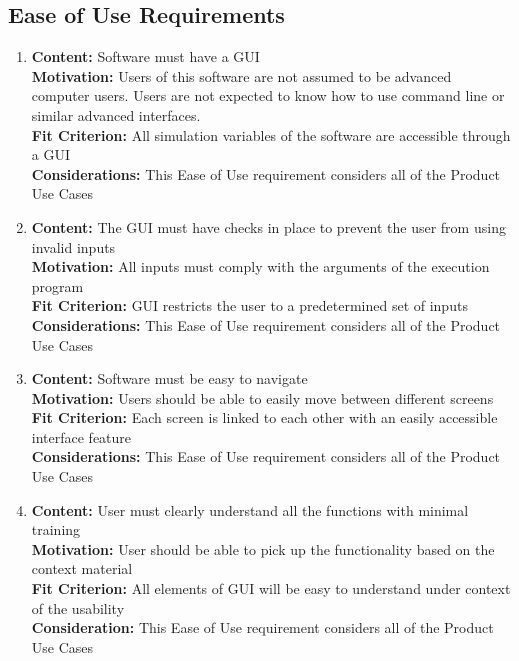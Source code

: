 \documentclass[paper=letter, fontsize=10pt]{scrartcl}
\numberwithin{equation}{section}		%
\numberwithin{figure}{section}			%
\numberwithin{table}{section}				%
\begin{document}
\subsection{Ease of Use Requirements}
\begin{enumerate}
	\item \textbf{Content:} Software must have a GUI
	\\	  \textbf{Motivation:} Users of this software are not assumed to be advanced computer users. Users are not expected to know how to use command line or similar advanced interfaces. 
	\\	  \textbf{Fit Criterion:} All simulation variables of the software are accessible through a GUI
	\\	  \textbf{Considerations:} This Ease of Use requirement considers all of the Product Use Cases
	\item \textbf{Content:} The GUI must have checks in place to prevent the user from using invalid inputs 
	\\	  \textbf{Motivation:} All inputs must comply with the arguments of the execution program
	\\	  \textbf{Fit Criterion:} GUI restricts the user to a predetermined set of inputs
	\\	  \textbf{Considerations:} This Ease of Use requirement considers all of the Product Use Cases
	\item \textbf{Content:} Software must be easy to navigate
	\\	  \textbf{Motivation:} Users should be able to easily move between different screens
	\\	  \textbf{Fit Criterion:} Each screen is linked to each other with an easily accessible interface feature
	\\	  \textbf{Considerations:} This Ease of Use requirement considers all of the Product Use Cases
	\item \textbf{Content:} User must clearly understand all the functions with minimal training
	\\	  \textbf{Motivation:} User should be able to pick up the functionality based on the context material
	\\	  \textbf{Fit Criterion:} All elements of GUI will be easy to understand under context of the usability
	\\	  \textbf{Consideration:} This Ease of Use requirement considers all of the Product Use Cases
\end{enumerate}
\end{document}
